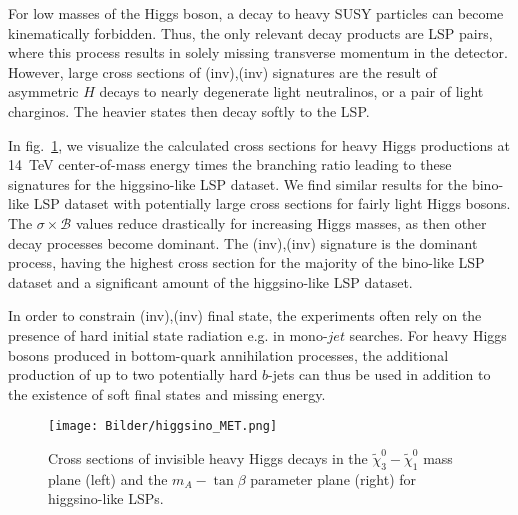 \documentclass[11pt,a4paper]{article}
\begin{document}
For low masses of the Higgs boson, a decay to heavy SUSY particles can become kinematically forbidden. Thus, the only relevant decay products are LSP pairs, where this process results in solely missing transverse momentum in the detector. However, large cross sections of (inv),(inv) signatures are the result of asymmetric $H$ decays to nearly degenerate light neutralinos, or a pair of light charginos. The heavier states then decay softly to the LSP.

In fig.~\ref{fig_inv}, we visualize the calculated cross sections for heavy Higgs productions at 14~TeV center-of-mass energy times the branching ratio leading to these signatures for the higgsino-like LSP dataset. We find similar results for the bino-like LSP dataset with potentially large cross sections for fairly light Higgs bosons. The $\sigma\times\mathcal{B}$ values reduce drastically for increasing Higgs masses, as then other decay processes become dominant. The (inv),(inv) signature is the dominant process, having the highest cross section for the majority of the bino-like LSP dataset and a significant amount of the higgsino-like LSP dataset.

In order to constrain (inv),(inv) final state, the experiments often rely on the presence of hard initial state radiation e.g. in mono-$jet$ searches. For heavy Higgs bosons produced in bottom-quark annihilation processes, the additional production of up to two potentially hard $b$-jets can thus be used in addition to the existence of soft final states and missing energy.

\begin{figure}[h]
\centering
\texttt{[image: Bilder/higgsino\_MET.png]}
\caption{Cross sections of invisible heavy Higgs decays in the $\tilde{\chi}^0_3-\tilde{\chi}^0_1$ mass plane (left) and the $m_A-\tan\beta$ parameter plane (right) for higgsino-like LSPs.}\label{fig_inv}
\end{figure}
\end{document}
